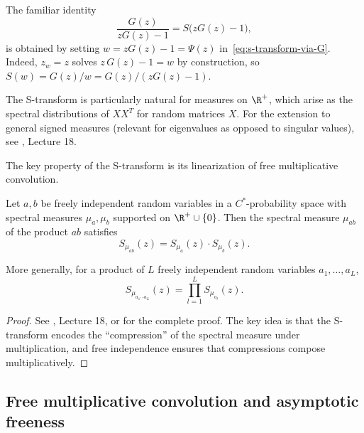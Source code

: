 \begin{remark}\label{rem:reconciliation_cauchy__s_transform_relation}
The familiar identity
\[
\frac{G(z)}{zG(z)-1} = S\bigl(zG(z)-1\bigr),
\]
is obtained by setting $w = zG(z) - 1 = \Psi(z)$ in~\eqref{eq:s-transform-via-G}. Indeed, $z_w = z$ solves $z\,G(z) - 1 = w$ by construction, so $S(w) = G(z)/w = G(z)/(zG(z)-1)$.
\end{remark}

\begin{remark}\label{rem:s_transform_particularly_natural_measures}
The S-transform is particularly natural for measures on $\R^+$, which arise as the spectral distributions of $XX^T$ for random matrices $X$. For the extension to general signed measures (relevant for eigenvalues as opposed to singular values), see \cite{nica2006lectures}, Lecture 18.
\end{remark}

The key property of the S-transform is its linearization of free multiplicative convolution.

\begin{theorem}\label{thm:s-linearization}
Let $a, b$ be freely independent random variables in a $C^*$-probability space with spectral measures $\mu_a, \mu_b$ supported on $\R^+ \cup \{0\}$. Then the spectral measure $\mu_{ab}$ of the product $ab$ satisfies
\begin{equation}\label{eq:s-multiplicative}
S_{\mu_{ab}}(z) = S_{\mu_a}(z) \cdot S_{\mu_b}(z).
\end{equation}

More generally, for a product of $L$ freely independent random variables $a_1, \ldots, a_L$,
\begin{equation}
S_{\mu_{a_1 \cdots a_L}}(z) = \prod_{l=1}^L S_{\mu_{a_l}}(z).
\end{equation}
\end{theorem}

\begin{proof}
See \cite{nica2006lectures}, Lecture 18, or \cite{voiculescu1992free} for the complete proof. The key idea is that the S-transform encodes the ``compression'' of the spectral measure under multiplication, and free independence ensures that compressions compose multiplicatively.
\end{proof}

\subsection{Free multiplicative convolution and asymptotic freeness}


